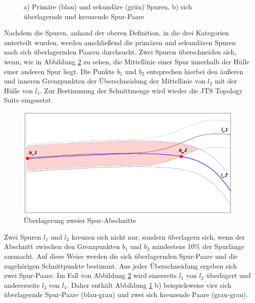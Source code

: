 \begin{figure}[H]
    \centering
    \qquad
    \caption{a) Primäre (blau) und sekundäre (grün) Spuren, b) sich überlagernde und kreuzende Spur-Paare}
    \label{fig:real2_prim_and_sec_lanes}
\end{figure}

Nachdem die Spuren, anhand der oberen Definition, in die drei Kategorien unterteilt wurden, werden
anschließend die primären und sekundären Spuren nach sich überlagernden Paaren durchsucht.
Zwei Spuren überschneiden sich, wenn, wie in
Abbildung \ref{fig:real2_lane_crossing} zu sehen, die Mittellinie einer Spur innerhalb der Hülle einer
anderen Spur liegt. Die Punkte $b_1$ und $b_2$ entsprechen hierbei den äußeren und inneren Grenzpunkten
der Überschneidung der Mittellinie von $l_2$ mit der Hülle von $l_1$. Zur Bestimmung der Schnittmenge
wird wieder die JTS Topology Suite eingesetzt.

\begin{figure}[H]
    \centering
    \includegraphics[width=0.5\linewidth]{resources/img/umsetzung/U2/lane_crossing}
    \caption{Überlagerung zweier Spur-Abschnitte}
    \label{fig:real2_lane_crossing}
\end{figure}

Zwei Spuren $l_1$ und $l_2$ kreuzen sich nicht nur, sondern überlagern sich, wenn der Abschnitt zwischen
den Grenzpunkten $b_1$ und $b_2$ mindestens 10\% der Spurlänge ausmacht. Auf diese Weise werden die
sich überlagernden Spur-Paare und die zugehörigen Schnittpunkte bestimmt.
Aus jeder Überschneidung ergeben sich zwei Spur-Paare.
Im Fall von Abbildung \ref{fig:real2_lane_crossing} wird einerseits $l_1$ von $l_2$ überlagert und andererseits
$l_2$ von $l_1$.
Daher enthält Abbildung \ref{fig:real2_prim_and_sec_lanes} b) beispielsweise vier sich überlagernde Spur-Paare
(blau-grau) und zwei sich kreuzende Paare (grau-grau).

